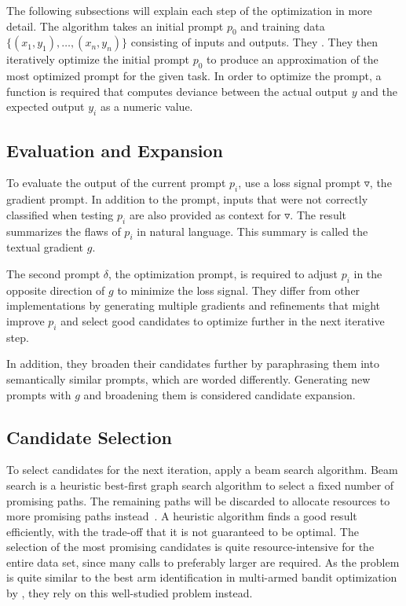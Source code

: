 The following subsections will explain each step of the \ProTeGi optimization in more detail.
The \ProTeGi algorithm takes an initial prompt $p_0$ and training data $\{(x_1, y_1), \dots, (x_n, y_n)\}$ consisting of inputs and outputs.
They .
They then iteratively optimize the initial prompt $p_0$ to produce an approximation of the most optimized prompt for the given task.
In order to optimize the prompt, a function is required that computes deviance between the actual output $y$ and the expected output $y_i$ as a numeric value.


\subsection{Evaluation and Expansion}
To evaluate the output of the current prompt $p_i$, \citeauthor{pryzant2023AutomaticPrompt} use a loss signal prompt $\triangledown$, the gradient prompt.
In addition to the prompt, inputs that were not correctly classified when testing $p_i$ are also provided as context for $\triangledown$.
The result summarizes the flaws of $p_i$ in natural language.
This summary is called the textual gradient $g$.

The second prompt $\delta$, the optimization prompt, is required to adjust $p_i$ in the opposite direction of $g$ to minimize the loss signal.
They differ from other implementations by generating multiple gradients and refinements that might improve $p_i$ and select good candidates to optimize further in the next iterative step.

In addition, they broaden their candidates further by paraphrasing them into semantically similar prompts, which are worded differently.
Generating new prompts with $g$ and broadening them is considered candidate expansion.


\subsection{Candidate Selection}
To select candidates for the next iteration, \citeauthor{pryzant2023AutomaticPrompt} apply a beam search algorithm.
Beam search is a heuristic best-first graph search algorithm to select a fixed number of promising paths.
The remaining paths will be discarded to allocate resources to more promising paths instead~\cite{BeamSearch}.
A heuristic algorithm finds a good result efficiently, with the trade-off that it is not guaranteed to be optimal.
The selection of the most promising candidates is quite resource-intensive for the entire data set, since many calls to preferably larger \LLMs are required.
As the problem is quite similar to the best arm identification in multi-armed bandit optimization by , they rely on this well-studied problem instead.


